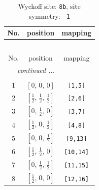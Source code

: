 \documentclass[fleqn,8pt]{jsarticle}
\begin{document}
\begin{longtable}{ccc}
\caption{Wyckoff site: {\tt 8b}, site symmetry: {\tt -1}}
 \\
 \hline \hline
No. & position & mapping \\ \hline \endfirsthead

\multicolumn{2}{l}{\tablename\ \thetable{}} \\
 \hline \hline
No. & position & mapping \\ \hline \endhead

 \hline \hline
\multicolumn{2}{r}{\footnotesize\it continued ...} \\ \endfoot

 \hline \hline
\multicolumn{2}{r}{} \\ \endlastfoot

1 & $\left[ 0,\, 0,\, 0 \right]$ & {\tt [1,5]} \\ \hline
2 & $\left[ \frac{1}{2},\, \frac{1}{2},\, \frac{1}{2} \right]$ & {\tt [2,6]} \\ \hline
3 & $\left[ 0,\, \frac{1}{2},\, 0 \right]$ & {\tt [3,7]} \\ \hline
4 & $\left[ \frac{1}{2},\, 0,\, \frac{1}{2} \right]$ & {\tt [4,8]} \\ \hline
5 & $\left[ 0,\, 0,\, \frac{1}{2} \right]$ & {\tt [9,13]} \\ \hline
6 & $\left[ \frac{1}{2},\, \frac{1}{2},\, 0 \right]$ & {\tt [10,14]} \\ \hline
7 & $\left[ 0,\, \frac{1}{2},\, \frac{1}{2} \right]$ & {\tt [11,15]} \\ \hline
8 & $\left[ \frac{1}{2},\, 0,\, 0 \right]$ & {\tt [12,16]} \\
\end{longtable}
\renewcommand{\arraystretch}{1.2}
\end{document}
